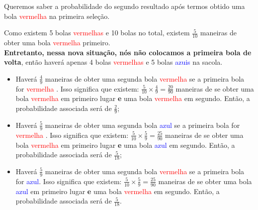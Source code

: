 \documentclass[
]{book}
\providecommand{\tightlist}{%
  \setlength{\itemsep}{0pt}\setlength{\parskip}{0pt}}
\begin{document}
\hfill\break

Queremos saber a probabilidade do segundo resultado após termos obtido uma bola \textcolor{red}{vermelha} na primeira seleção.

\hfill\break

Como existem 5 bolas \textcolor{red}{vermelhas} e 10 bolas no total, existem \(\frac{5}{10}\) maneiras de obter uma bola \textcolor{red}{vermelha} primeiro.\\

\textbf{Entretanto, nessa nova situação, nós não colocamos a primeira bola de volta}, então haverá apenas 4 bolas \textcolor{red}{vermelhas} e 5 bolas \textcolor{blue}{azuis} na sacola.

\hfill\break

\begin{itemize}
\tightlist
\item
  Haverá \(\frac{4}{9}\) maneiras de obter uma segunda bola \textcolor{red}{vermelha} se a primeira bola for \textcolor{red}{vermelha} . Isso significa que existem: \(\frac{5}{10} \times \frac{4}{9}= \frac{20}{90}\) maneiras de se obter uma bola \textcolor{red}{vermelha} em primeiro lugar \textbf{e} uma bola \textcolor{red}{vermelha} em segundo. Então, a probabilidade associada será de \(\frac{2}{9}\);
\end{itemize}

\hfill\break

\begin{itemize}
\tightlist
\item
  Haverá \(\frac{5}{9}\) maneiras de obter uma segunda bola \textcolor{blue}{azul} se a primeira bola for \textcolor{red}{vermelha} . Isso significa que existem: \(\frac{5}{10} \times \frac{5}{9}= \frac{25}{90}\) maneiras de se obter uma bola \textcolor{red}{vermelha} em primeiro lugar \textbf{e} uma bola \textcolor{blue}{azul} em segundo. Então, a probabilidade associada será de \(\frac{5}{18}\);
\end{itemize}

\hfill\break

\begin{itemize}
\tightlist
\item
  Haverá \(\frac{5}{9}\) maneiras de obter uma segunda bola \textcolor{red}{vermelha} se a primeira bola for \textcolor{blue}{azul}. Isso significa que existem: \(\frac{5}{10} \times \frac{5}{9}= \frac{25}{90}\) maneiras de se obter uma bola \textcolor{blue}{azul} em primeiro lugar \textbf{e} uma bola \textcolor{red}{vermelha} em segundo. Então, a probabilidade associada será de \(\frac{5}{18}\).
\end{itemize}
\end{document}
